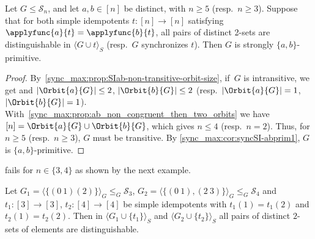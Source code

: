 \begin{proposition}
	\label{sync_max:cor:2-sets_transitive}	
Let $G \le \mathcal{S}_n$, and let $a,b \in [n]$ be distinct, with $n \ge 5$ (resp.~$n \ge 3$).
Suppose that for both simple idempotents $t \colon [n] \to [n]$ satisfying $\applyfunc{a}{t} = \applyfunc{b}{t}$, all pairs of distinct 2-sets are distinguishable in $\langle G \cup {t} \rangle_S$ (resp.~$G$ synchronizes $t$).
Then $G$ is strongly $\{a,b\}$-primitive.
\end{proposition}
\begin{proof}		
	By~\cref{sync_max:prop:SIab-non-transitive-orbit-size},
	if~$G$ is intransitive,
	we get and $|\Orbit{a}{G}| \le 2$, $|\Orbit{b}{G}| \le 2$ (resp.~$|\Orbit{a}{G}| = 1$, $|\Orbit{b}{G}| = 1$).
	With~\cref{sync_max:prop:ab_non_congruent_then_two_orbits}
	we have $[n] = \Orbit{a}{G} \cup \Orbit{b}{G}$, which gives $n \le 4$ (resp.~$n = 2$).
	Thus, for $n \ge 5$ (resp.~$n \ge 3$), $G$ must be transitive.	
	By \cref{sync_max:cor:syncSI-abprim1},
	$G$ is $\{a,b\}$-primitive.
\end{proof}

 fails for $n \in \{3,4\}$
as shown by the next example.

\begin{example}
	Let $G_1 = \langle \{ (0 ~ 1) (2) \} \rangle_G \le_G \mathcal S_3$,
	$G_2 = \langle \{ (0 ~ 1), (2 ~ 3) \}\rangle_G \le_G \mathcal S_4$
	and $t_1 \colon [3] \to [3]$, $t_2 \colon [4] \to [4]$
	be simple idempotents with $t_1(1) = t_1(2)$
	and $t_2(1) = t_2(2)$.
	Then in $\langle G_1 \cup \{t_1\} \rangle_S$
	and $\langle G_2 \cup \{t_2\} \rangle_S$
	all pairs of distinct $2$-sets of elements
	are distinguishable.
\end{example}

